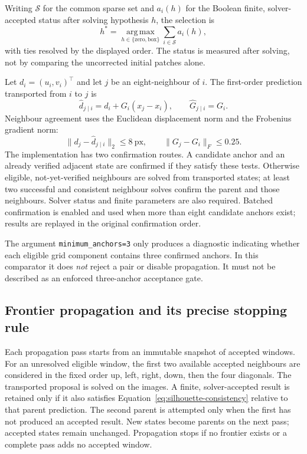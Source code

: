 Writing $\mathcal S$ for the common sparse set and $a_i(h)$ for the Boolean
finite, solver-accepted status after solving hypothesis $h$, the selection is
\begin{equation}
 h^*=\operatorname*{arg\,max}_{h\in\{\mathrm{zero},\mathrm{box}\}}
       \sum_{i\in\mathcal S} a_i(h),
 \label{eq:hypothesis-selection}
\end{equation}
with ties resolved by the displayed order. The status is measured after solving,
not by comparing the uncorrected initial patches alone.

Let $d_i=(u_i,v_i)^\top$ and let $j$ be an eight-neighbour of $i$. The first-order
prediction transported from $i$ to $j$ is
\begin{equation}
 \widehat d_{j\mid i}=d_i+G_i(x_j-x_i),\qquad
 \widehat G_{j\mid i}=G_i.
 \label{eq:silhouette-transport}
\end{equation}
Neighbour agreement uses the Euclidean displacement norm and the Frobenius
gradient norm:
\begin{equation}
 \|d_j-\widehat d_{j\mid i}\|_2\le8\ \mathrm{px},\qquad
 \|G_j-G_i\|_F\le0.25.
 \label{eq:silhouette-consistency}
\end{equation}
The implementation has two confirmation routes. A candidate anchor and an
already verified adjacent state are confirmed if they satisfy these tests.
Otherwise eligible, not-yet-verified neighbours are solved from transported
states; at least two successful and consistent neighbour solves confirm the
parent and those neighbours. Solver status and finite parameters are also
required. Batched confirmation is enabled and used when more than eight
candidate anchors exist; results are replayed in the original confirmation
order.

The argument \texttt{minimum\_anchors=3} only produces a diagnostic indicating
whether each eligible grid component contains three confirmed anchors. In
this comparator it does \emph{not} reject a pair or disable propagation.
It must not be described as an enforced three-anchor acceptance gate.

\subsection{Frontier propagation and its precise stopping rule}
Each propagation pass starts from an immutable snapshot of accepted windows.
For an unresolved eligible window, the first two available accepted neighbours
are considered in the fixed order up, left, right, down, then the four
diagonals. The transported proposal is solved on the images. A finite,
solver-accepted result is retained only if it also satisfies
Equation~\eqref{eq:silhouette-consistency} relative to that parent prediction.
The second parent is attempted only when the first has not produced an
accepted result. New states become parents on the next pass; accepted states
remain unchanged. Propagation stops if no frontier exists or a complete pass
adds no accepted window.

